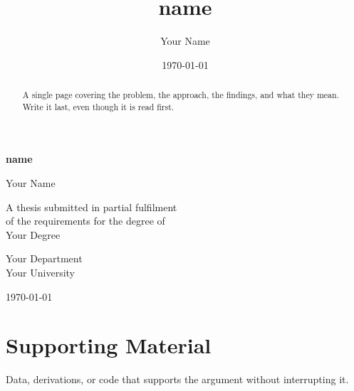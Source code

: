 \documentclass[12pt,a4paper,oneside]{report}
\title{{name}}
\author{Your Name}
\date{\today}
\begin{document}
\begin{titlepage}
    \centering
    \vspace*{2cm}

    {\LARGE\bfseries {name}\par}
    \vspace{1.5cm}

    {\Large Your Name\par}
    \vspace{1cm}

    {\large A thesis submitted in partial fulfilment \\
     of the requirements for the degree of \\
     Your Degree\par}
    \vspace{1.5cm}

    {\large Your Department \\ Your University\par}
    \vfill

    {\large \today\par}
\end{titlepage}

\begin{abstract}
    A single page covering the problem, the approach, the findings, and
    what they mean. Write it last, even though it is read first.
\end{abstract}

\tableofcontents
\listoffigures
\listoftables










\appendix
\chapter{Supporting Material}

Data, derivations, or code that supports the argument without
interrupting it.
\end{document}
